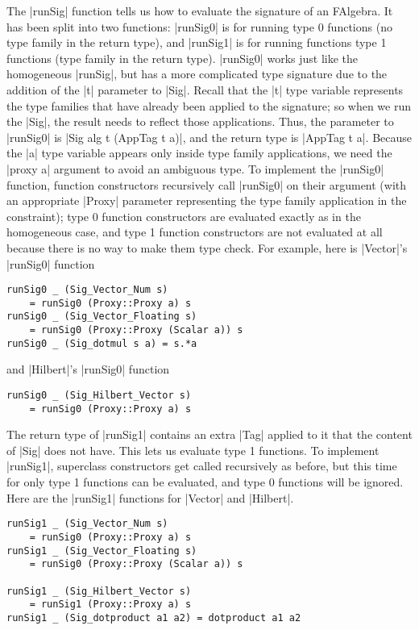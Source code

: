 \documentclass[preprint]{sigplanconf}
\theoremstyle{definition}
\begin{document}
The |runSig| function tells us how to evaluate the signature of an FAlgebra.
It has been split into two functions:
|runSig0| is for running type 0 functions (no type family in the return type),
and |runSig1| is for running functions type 1 functions (type family in the return type).
|runSig0| works just like the homogeneous |runSig|,
but has a more complicated type signature due to the addition of the |t| parameter to |Sig|.
Recall that the |t| type variable represents the type families that have already been applied to the signature;
so when we run the |Sig|, the result needs to reflect those applications.
Thus, the parameter to |runSig0| is |Sig alg t (AppTag t a)|,
and the return type is |AppTag t a|.
Because the |a| type variable appears only inside type family applications,
we need the |proxy a| argument to avoid an ambiguous type.
To implement the |runSig0| function, function constructors recursively call |runSig0| on their argument (with an appropriate |Proxy| parameter representing the type family application in the constraint);
type 0 function constructors are evaluated exactly as in the homogeneous case,
and type 1 function constructors are not evaluated at all because there is no way to make them type check.
For example, here is |Vector|'s |runSig0| function
\begin{lstlisting}
runSig0 _ (Sig_Vector_Num s)
    = runSig0 (Proxy::Proxy a) s
runSig0 _ (Sig_Vector_Floating s)
    = runSig0 (Proxy::Proxy (Scalar a)) s
runSig0 _ (Sig_dotmul s a) = s.*a
\end{lstlisting}
and |Hilbert|'s |runSig0| function
\begin{lstlisting}
runSig0 _ (Sig_Hilbert_Vector s)
    = runSig0 (Proxy::Proxy a) s
\end{lstlisting}
The return type of |runSig1| contains an extra |Tag| applied to it that the content of |Sig| does not have.
This lets us evaluate type 1 functions.
To implement |runSig1|, superclass constructors get called recursively as before,
but this time for only type 1 functions can be evaluated,
and type 0 functions will be ignored.
Here are the |runSig1| functions for |Vector| and |Hilbert|.
\begin{lstlisting}
runSig1 _ (Sig_Vector_Num s)
    = runSig0 (Proxy::Proxy a) s
runSig1 _ (Sig_Vector_Floating s)
    = runSig0 (Proxy::Proxy (Scalar a)) s

runSig1 _ (Sig_Hilbert_Vector s)
    = runSig1 (Proxy::Proxy a) s
runSig1 _ (Sig_dotproduct a1 a2) = dotproduct a1 a2
\end{lstlisting}
\end{document}
